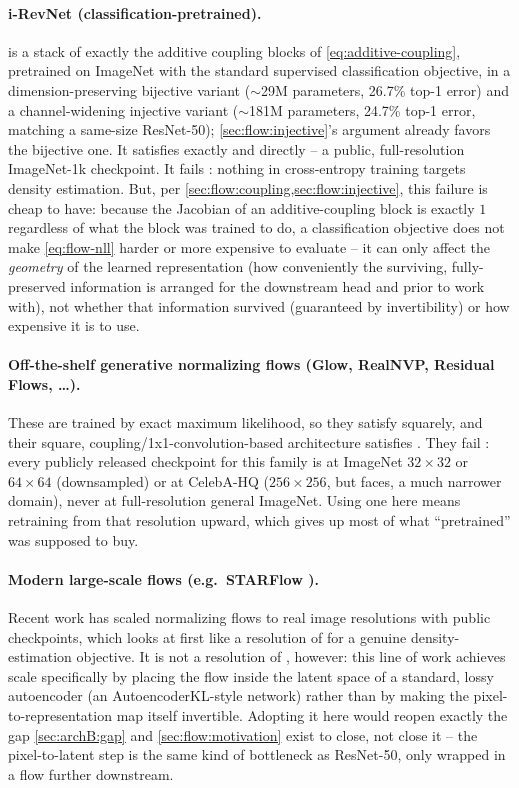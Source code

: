 \paragraph{i-RevNet (classification-pretrained).} \cite{jacobsen2018} is a stack of exactly the additive
coupling blocks of \cref{eq:additive-coupling}, pretrained on ImageNet with the standard supervised
classification objective, in a dimension-preserving bijective variant ($\sim$29M parameters, 26.7\%
top-1 error) and a channel-widening injective variant ($\sim$181M parameters, 24.7\% top-1 error,
matching a same-size ResNet-50); \cref{sec:flow:injective}'s argument already favors the bijective one.
It satisfies  exactly and  directly -- a public, full-resolution
ImageNet-1k checkpoint. It fails : nothing in cross-entropy training targets
density estimation. But, per \cref{sec:flow:coupling,sec:flow:injective}, this failure is cheap to have:
because the Jacobian of an additive-coupling block is exactly $1$ regardless of what the block was
trained to do, a classification objective does not make \cref{eq:flow-nll} harder or more expensive to
evaluate -- it can only affect the \emph{geometry} of the learned representation (how conveniently the
surviving, fully-preserved information is arranged for the downstream head and prior to work with), not
whether that information survived (guaranteed by invertibility) or how expensive it is to use.

\paragraph{Off-the-shelf generative normalizing flows (Glow, RealNVP, Residual Flows, \dots).} These are
trained by exact maximum likelihood, so they satisfy  squarely, and their
square, coupling/1x1-convolution-based architecture satisfies . They fail
: every publicly released checkpoint for this family is at ImageNet $32\times32$ or
$64\times64$ (downsampled) or at CelebA-HQ ($256\times256$, but faces, a much narrower domain), never at
full-resolution general ImageNet. Using one here means retraining from that resolution upward, which
gives up most of what ``pretrained'' was supposed to buy.

\paragraph{Modern large-scale flows (e.g.\ STARFlow \cite{gu2025starflow}).} Recent work has scaled
normalizing flows to real image resolutions with public checkpoints, which looks at first like a
resolution of  for a genuine density-estimation objective. It is not a resolution of
, however: this line of work achieves scale specifically by placing the flow inside
the latent space of a standard, lossy autoencoder (an AutoencoderKL-style network) rather than by making
the pixel-to-representation map itself invertible. Adopting it here would reopen exactly the gap
\cref{sec:archB:gap} and \cref{sec:flow:motivation} exist to close, not close it -- the pixel-to-latent
step is the same kind of bottleneck as ResNet-50, only wrapped in a flow further downstream.

